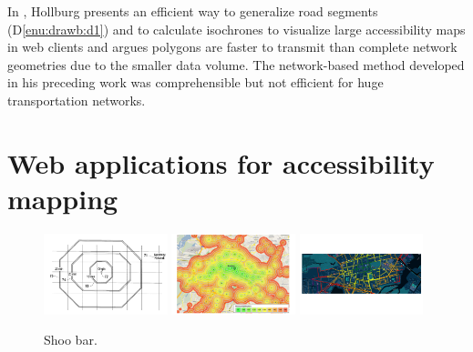     In \cite{Hollburg2014}, Hollburg
    presents an efficient way to generalize road segments (D\ref{enu:drawb:d1})
    and to calculate isochrones to visualize large accessibility maps in web
    clients and argues polygons are faster to transmit than complete network
    geometries due to the smaller data volume. The network-based method
    developed in his preceding work was comprehensible but not efficient for
    huge transportation networks.\par

  \section{Web applications for accessibility mapping}
    \label{sec:overv:applc}

    \begin{figure}[t]
      {\includegraphics[width=0.32\textwidth]{./img/overv-patnt.png}}
      \hfill
      {\includegraphics[width=0.32\textwidth]{./img/overv-berln.png}}
      \hfill
      {\includegraphics[width=0.32\textwidth]{./img/overv-potsd.png}}
      \caption{Shoo bar.}
      \label{fig:overv:3}
    \end{figure}

